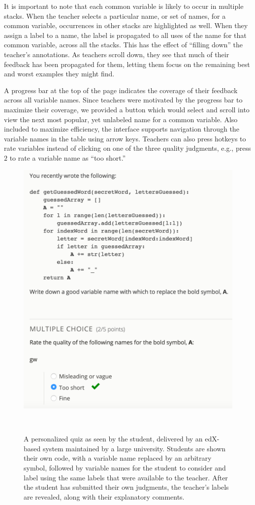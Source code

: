It is important to note that each common variable is likely to occur in multiple stacks. When the teacher selects a particular name, or set of names, for a common variable, occurrences in other stacks are highlighted as well. When they assign a label to a name, the label is propagated to all uses of the name for that common variable, across all the stacks. This has the effect of ``filling down'' the teacher's annotations. As teachers scroll down, they see that much of their feedback has been propagated for them, letting them focus on the remaining best and worst examples they might find. 

A progress bar at the top of the page indicates the coverage of their feedback across all variable names. Since teachers were motivated by the progress bar to maximize their coverage, we provided a button which would select and scroll into view the next most popular, yet unlabeled name for a common variable. Also included to maximize efficiency, the interface supports navigation through the variable names in the table using arrow keys. Teachers can also press hotkeys to rate variables instead of clicking on one of the three quality judgments, e.g., press $2$ to rate a variable name as ``too short.''

\begin{figure}
\centering
\includegraphics[width=0.95\columnwidth]{Body/figures/foobaz/feedbackQuizExample.png}
\caption{A personalized quiz as seen by the student, delivered by an edX-based system maintained by a large university. Students are shown their own code, with a variable name replaced by an arbitrary symbol, followed by variable names for the student to consider and label using the same labels that were available to the teacher. After the student has submitted their own judgments, the teacher's labels are revealed, along with their explanatory comments.}~\label{fig:figure4}
\end{figure}

